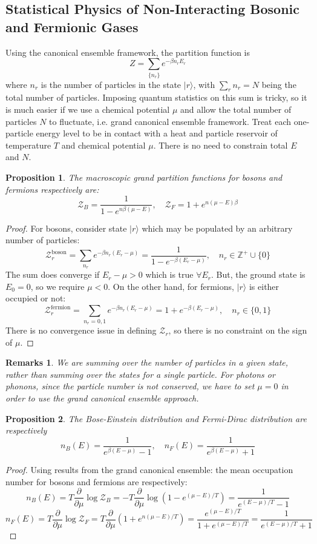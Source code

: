 \documentclass[a4paper]{article}
\newtheorem{remarks}{Remarks}[section]
\theoremstyle{new}
\newtheorem{prop}{Proposition}[section]
\begin{document}
\subsection{Statistical Physics of Non-Interacting Bosonic and Fermionic Gases}
Using the canonical ensemble framework, the partition function is
$$Z=\sum_{\{n_r\}}e^{-\beta n_rE_r}$$
where $n_r$ is the number of particles in the state $|r\rangle$, with $\sum_rn_r=N$ being the total number of particles. Imposing quantum statistics on this sum is tricky, so it is much easier if we use a chemical potential $\mu$ and allow the total number of particles $N$ to fluctuate, i.e. grand canonical ensemble framework. Treat each one-particle energy level to be in contact with a heat and particle reservoir of temperature $T$ and chemical potential $\mu$. There is no need to constrain total $E$ and $N$. 
\begin{prop}
The macroscopic grand partition functions for bosons and fermions respectively are:
$$\mathcal{Z}_B=\frac{1}{1-e^{n\beta(\mu-E)}},\quad\mathcal{Z}_F=1+e^{n(\mu-E)\beta}$$
\end{prop}
\begin{proof}
For bosons, consider state $|r\rangle$ which may be populated by an arbitrary number of particles:
$$\mathcal{Z}^{\text{boson}}_r=\sum_{n_r}e^{-\beta n_r(E_r-\mu)}=\frac{1}{1-e^{-\beta(E_r-\mu)}},\quad n_r\in\mathbb{Z}^+\cup\{0\}$$
The sum does converge if $E_r-\mu>0$ which is true $\forall E_r$. But, the ground state is $E_0=0$, so we require $\mu<0$. On the other hand, for fermions, $|r\rangle$ is either occupied or not:
$$\mathcal{Z}^{\text{fermion}}_r=\sum_{n_r=0,1}e^{-\beta n_r(E_r-\mu)}=1+e^{-\beta(E_r-\mu)},\quad n_r\in\{0,1\}$$
There is no convergence issue in defining $\mathcal{Z}_r$, so there is no constraint on the sign of $\mu$.
\end{proof}
\begin{remarks}
We are summing over the number of particles in a given state, rather than summing over the states for a single particle. For photons or phonons, since the particle number is not conserved, we have to set $\mu=0$ in order to use the grand canonical ensemble approach.
\end{remarks}
\begin{prop}
The Bose-Einstein distribution and Fermi-Dirac distribution are respectively
$$n_B(E)=\frac{1}{e^{\beta(E-\mu)}-1},\quad n_F(E)=\frac{1}{e^{\beta(E-\mu)}+1}$$
\end{prop}
\begin{proof}
Using results from the grand canonical ensemble: the mean occupation number for bosons and fermions are respectively:
$$n_B(E)=T\frac{\partial}{\partial\mu}\log \mathcal{Z}_B=-T\frac{\partial}{\partial\mu}\log(1-e^{(\mu-E)/T})=\frac{1}{e^{(E-\mu)/T}-1}$$
$$n_F(E)=T\frac{\partial}{\partial\mu}\log\mathcal{Z}_F=T\frac{\partial}{\partial\mu}(1+e^{n(\mu-E)/T})=\frac{e^{(\mu-E)/T}}{1+e^{(\mu-E)/T}}=\frac{1}{e^{(E-\mu)/T}+1}$$
\end{proof}
\end{document}
